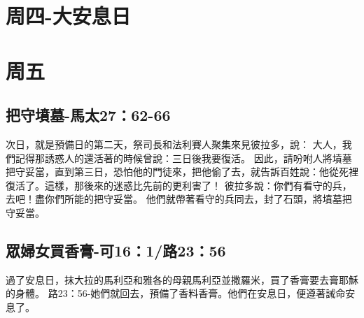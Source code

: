 \section{周四-大安息日}

\section{周五}

\subsection{把守墳墓-馬太27：62-66}

次日，就是預備日的第二天，祭司長和法利賽人聚集來見彼拉多，說：
大人，我們記得那誘惑人的還活著的時候曾說：三日後我要復活。
因此，請吩咐人將墳墓把守妥當，直到第三日，恐怕他的門徒來，把他偷了去，就告訴百姓說：他從死裡復活了。這樣，那後來的迷惑比先前的更利害了！
彼拉多說：你們有看守的兵，去吧！盡你們所能的把守妥當。
他們就帶著看守的兵同去，封了石頭，將墳墓把守妥當。

\subsection{眾婦女買香膏-可16：1/路23：56}

過了安息日，抹大拉的馬利亞和雅各的母親馬利亞並撒羅米，買了香膏要去膏耶穌的身體。
路23：56-她們就回去，預備了香料香膏。他們在安息日，便遵著誡命安息了。

